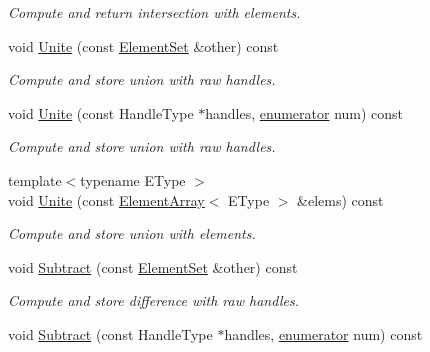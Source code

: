 \begin{DoxyCompactItemize}
\begin{DoxyCompactList}\small\item\em Compute and return intersection with elements. \end{DoxyCompactList}\item 
\hypertarget{classINMOST_1_1ElementSet_a844bc0a82eb19514e7033bc831df0a9e}{void \hyperlink{classINMOST_1_1ElementSet_a844bc0a82eb19514e7033bc831df0a9e}{Unite} (const \hyperlink{classINMOST_1_1ElementSet}{Element\-Set} \&other) const }\label{classINMOST_1_1ElementSet_a844bc0a82eb19514e7033bc831df0a9e}

\begin{DoxyCompactList}\small\item\em Compute and store union with raw handles. \end{DoxyCompactList}\item 
\hypertarget{classINMOST_1_1ElementSet_ae591fb8fad3f163e8c26c264db8f6e4c}{void \hyperlink{classINMOST_1_1ElementSet_ae591fb8fad3f163e8c26c264db8f6e4c}{Unite} (const Handle\-Type $\ast$handles, \hyperlink{classINMOST_1_1Storage_ae333dfced6fa9cfde0c8e7dcf1b0cc2b}{enumerator} num) const }\label{classINMOST_1_1ElementSet_ae591fb8fad3f163e8c26c264db8f6e4c}

\begin{DoxyCompactList}\small\item\em Compute and store union with raw handles. \end{DoxyCompactList}\item 
\hypertarget{classINMOST_1_1ElementSet_af22386930e063d805c1961222e202b24}{{\footnotesize template$<$typename E\-Type $>$ }\\void \hyperlink{classINMOST_1_1ElementSet_af22386930e063d805c1961222e202b24}{Unite} (const \hyperlink{classINMOST_1_1ElementArray}{Element\-Array}$<$ E\-Type $>$ \&elems) const }\label{classINMOST_1_1ElementSet_af22386930e063d805c1961222e202b24}

\begin{DoxyCompactList}\small\item\em Compute and store union with elements. \end{DoxyCompactList}\item 
void \hyperlink{classINMOST_1_1ElementSet_a1aafea0ac742bcc3ec1873621ca41ccd}{Subtract} (const \hyperlink{classINMOST_1_1ElementSet}{Element\-Set} \&other) const 
\begin{DoxyCompactList}\small\item\em Compute and store difference with raw handles. \end{DoxyCompactList}\item 
\hypertarget{classINMOST_1_1ElementSet_aa61d299bbf8d4fd4c67a983c2139fbe5}{void \hyperlink{classINMOST_1_1ElementSet_aa61d299bbf8d4fd4c67a983c2139fbe5}{Subtract} (const Handle\-Type $\ast$handles, \hyperlink{classINMOST_1_1Storage_ae333dfced6fa9cfde0c8e7dcf1b0cc2b}{enumerator} num) const }\label{classINMOST_1_1ElementSet_aa61d299bbf8d4fd4c67a983c2139fbe5}


\end{DoxyCompactItemize}

